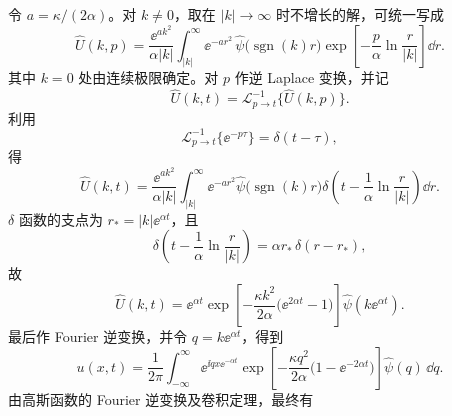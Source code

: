 \begin{question}[弹簧恢复力随机游走]
\begin{solution}
令 $a=\kappa/(2\alpha)$。对 $k\neq0$，取在 $|k|\to\infty$ 时不增长的解，可统一写成
\[
\hat U(k,p)
=\frac{\ee^{ak^{2}}}{\alpha|k|}
\int_{|k|}^{\infty}
\ee^{-ar^{2}}\,
\hat\psi\!\bigl(\operatorname{sgn}(k)r\bigr)
\exp\!\left[-\frac{p}{\alpha}\ln\frac{r}{|k|}\right]\dd r.
\]
其中 $k=0$ 处由连续极限确定。对 $p$ 作逆 Laplace 变换，并记
\[
\hat U(k,t)=\mathcal{L}^{-1}_{p\to t}\{\hat U(k,p)\}.
\]
利用
\[
\mathcal{L}^{-1}_{p\to t}\{\ee^{-p\tau}\}=\delta(t-\tau),
\]
得
\[
\hat U(k,t)
=\frac{\ee^{ak^{2}}}{\alpha|k|}
\int_{|k|}^{\infty}\ee^{-ar^{2}}
\hat\psi\!\bigl(\operatorname{sgn}(k)r\bigr)
\delta\!\left(t-\frac{1}{\alpha}\ln\frac{r}{|k|}\right)\dd r.
\]
$\delta$ 函数的支点为 $r_{*}=|k|\ee^{\alpha t}$，且
\[
\delta\!\left(t-\frac{1}{\alpha}\ln\frac{r}{|k|}\right)
=\alpha r_{*}\,\delta(r-r_{*}),
\]
故
\[
\hat U(k,t)
=\ee^{\alpha t}
\exp\!\left[-\frac{\kappa k^{2}}{2\alpha}
\bigl(\ee^{2\alpha t}-1\bigr)\right]
\hat\psi\!\left(k\ee^{\alpha t}\right).
\]
最后作 Fourier 逆变换，并令 $q=k\ee^{\alpha t}$，得到
\[
u(x,t)=\frac{1}{2\pi}\int_{-\infty}^{\infty}
\ee^{\ii qx\ee^{-\alpha t}}
\exp\!\left[-\frac{\kappa q^{2}}{2\alpha}
\bigl(1-\ee^{-2\alpha t}\bigr)\right]
\hat\psi(q)\,\dd q.
\]
由高斯函数的 Fourier 逆变换及卷积定理，最终有


\end{solution}
\end{question}

